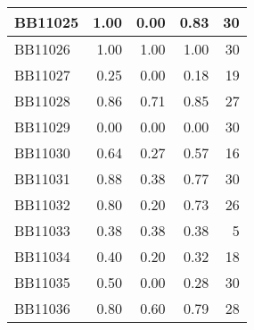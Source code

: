 \begin{longtable}{|l|r|r|r||r|}
	\hline
	BB11025 & \cellcolor[rgb]{ .988,  1,  .992}1.00 & \cellcolor[rgb]{ .384,  .745,  .478}0.00 & \cellcolor[rgb]{ .886,  .957,  .906}0.83 & \cellcolor[rgb]{ .973,  .412,  .42}30 \\
	\hline
	BB11026 & \cellcolor[rgb]{ .988,  1,  .992}1.00 & \cellcolor[rgb]{ .988,  1,  .992}1.00 & \cellcolor[rgb]{ .988,  1,  .992}1.00 & \cellcolor[rgb]{ .973,  .412,  .42}30 \\
	\hline
	BB11027 & \cellcolor[rgb]{ .988,  1,  .992}0.25 & \cellcolor[rgb]{ .384,  .745,  .478}0.00 & \cellcolor[rgb]{ .827,  .929,  .855}0.18 & \cellcolor[rgb]{ .98,  .624,  .635}19 \\
	\hline
	BB11028 & \cellcolor[rgb]{ .988,  1,  .992}0.86 & \cellcolor[rgb]{ .384,  .745,  .478}0.71 & \cellcolor[rgb]{ .941,  .98,  .953}0.85 & \cellcolor[rgb]{ .976,  .471,  .478}27 \\
	\hline
	BB11029 & \cellcolor[rgb]{ .988,  1,  .992}0.00 & \cellcolor[rgb]{ .988,  1,  .992}0.00 & \cellcolor[rgb]{ .988,  1,  .992}0.00 & \cellcolor[rgb]{ .973,  .412,  .42}30 \\
	\hline
	BB11030 & \cellcolor[rgb]{ .988,  1,  .992}0.64 & \cellcolor[rgb]{ .384,  .745,  .478}0.27 & \cellcolor[rgb]{ .882,  .953,  .902}0.57 & \cellcolor[rgb]{ .98,  .682,  .694}16 \\
	\hline
	BB11031 & \cellcolor[rgb]{ .988,  1,  .992}0.88 & \cellcolor[rgb]{ .384,  .745,  .478}0.38 & \cellcolor[rgb]{ .859,  .945,  .882}0.77 & \cellcolor[rgb]{ .973,  .412,  .42}30 \\
	\hline
	BB11032 & \cellcolor[rgb]{ .988,  1,  .992}0.80 & \cellcolor[rgb]{ .384,  .745,  .478}0.20 & \cellcolor[rgb]{ .918,  .969,  .929}0.73 & \cellcolor[rgb]{ .976,  .49,  .498}26 \\
	\hline
	BB11033 & \cellcolor[rgb]{ .988,  1,  .992}0.38 & \cellcolor[rgb]{ .988,  1,  .992}0.38 & \cellcolor[rgb]{ .988,  1,  .992}0.38 & \cellcolor[rgb]{ .988,  .894,  .906}5 \\
	\hline
	BB11034 & \cellcolor[rgb]{ .988,  1,  .992}0.40 & \cellcolor[rgb]{ .384,  .745,  .478}0.20 & \cellcolor[rgb]{ .753,  .898,  .792}0.32 & \cellcolor[rgb]{ .98,  .643,  .655}18 \\
	\hline
	BB11035 & \cellcolor[rgb]{ .988,  1,  .992}0.50 & \cellcolor[rgb]{ .384,  .745,  .478}0.00 & \cellcolor[rgb]{ .725,  .886,  .769}0.28 & \cellcolor[rgb]{ .973,  .412,  .42}30 \\
	\hline
	BB11036 & \cellcolor[rgb]{ .988,  1,  .992}0.80 & \cellcolor[rgb]{ .384,  .745,  .478}0.60 & \cellcolor[rgb]{ .965,  .988,  .973}0.79 & \cellcolor[rgb]{ .976,  .451,  .459}28 \\

\end{longtable}
